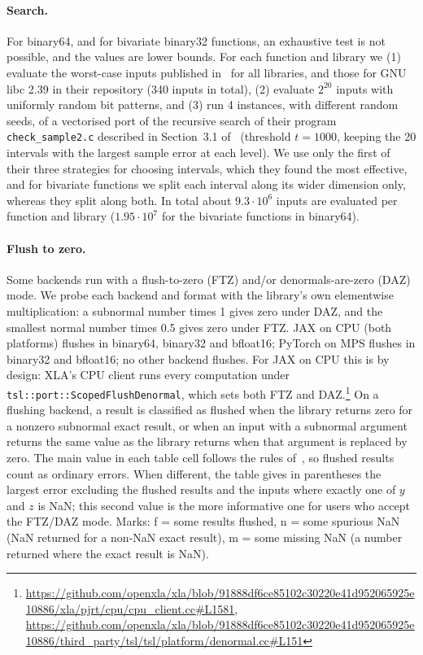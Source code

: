 \documentclass[11pt,a4paper]{article}
\begin{document}
\paragraph{Search.} For binary64, and for bivariate binary32 functions, an exhaustive test is not possible, and the values are lower bounds. For each function and library we (1) evaluate the worst-case inputs published in~\cite{GIMOZ2026} for all libraries, and those for GNU libc 2.39 in their repository (340 inputs in total), (2) evaluate $2^{20}$ inputs with uniformly random bit patterns, and (3) run 4 instances, with different random seeds, of a vectorised port of the recursive search of their program \texttt{check\_sample2.c} described in Section~3.1 of~\cite{GIMOZ2026} (threshold $t=1000$, keeping the 20 intervals with the largest sample error at each level). We use only the first of their three strategies for choosing intervals, which they found the most effective, and for bivariate functions we split each interval along its wider dimension only, whereas they split along both. In total about $9.3\cdot10^6$ inputs are evaluated per function and library ($1.95\cdot10^7$ for the bivariate functions in binary64).

\paragraph{Flush to zero.} Some backends run with a flush-to-zero (FTZ) and/or denormals-are-zero (DAZ) mode. We probe each backend and format with the library's own elementwise multiplication: a subnormal number times 1 gives zero under DAZ, and the smallest normal number times 0.5 gives zero under FTZ. JAX on CPU (both platforms) flushes in binary64, binary32 and bfloat16; PyTorch on MPS flushes in binary32 and bfloat16; no other backend flushes. For JAX on CPU this is by design: XLA's CPU client runs every computation under \texttt{tsl::port::ScopedFlushDenormal}, which sets both FTZ and DAZ.\footnote{\url{https://github.com/openxla/xla/blob/91888df6ce85102c30220e41d952065925e10886/xla/pjrt/cpu/cpu_client.cc\#L1581}, \url{https://github.com/openxla/xla/blob/91888df6ce85102c30220e41d952065925e10886/third_party/tsl/tsl/platform/denormal.cc\#L151}} On a flushing backend, a result is classified as flushed when the library returns zero for a nonzero subnormal exact result, or when an input with a subnormal argument returns the same value as the library returns when that argument is replaced by zero. The main value in each table cell follows the rules of~\cite{GIMOZ2026}, so flushed results count as ordinary errors. When different, the table gives in parentheses the largest error excluding the flushed results and the inputs where exactly one of $y$ and $z$ is NaN; this second value is the more informative one for users who accept the FTZ/DAZ mode. Marks: f = some results flushed, n = some spurious NaN (NaN returned for a non-NaN exact result), m = some missing NaN (a number returned where the exact result is NaN).
\end{document}

